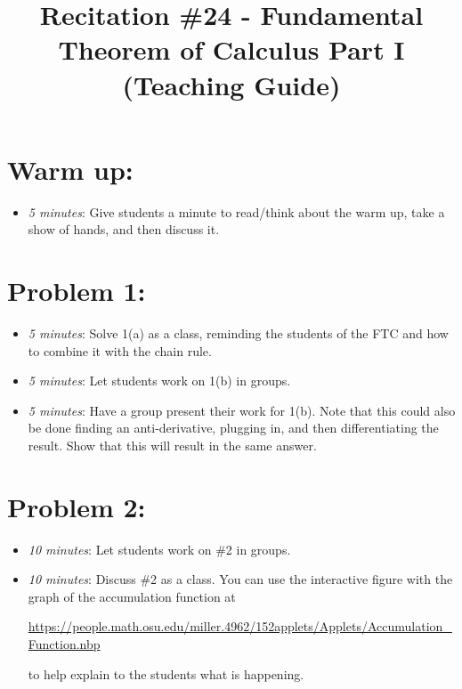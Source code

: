 \documentclass[handout,nooutcomes]{ximera}
\title{Recitation \#24 - Fundamental Theorem of Calculus Part I (Teaching Guide)}
\begin{document}
\begin{abstract}		\end{abstract}
\maketitle


\section*{Warm up:} 
	
	\begin{itemize}
	
	\item  \emph{5 minutes}:  Give students a minute to read/think about the warm up, take a show of hands, and then discuss it.
	
	
	
	\end{itemize}


\section*{Problem 1:}

	\begin{itemize}
	
	\item  \emph{5 minutes}:  Solve 1(a) as a class, reminding the students of the FTC and how to combine it with the chain rule.  
	
	\item  \emph{5 minutes}:  Let students work on 1(b) in groups.  
	
	\item  \emph{5 minutes}:  Have a group present their work for 1(b).  Note that this could also be done finding an anti-derivative, plugging in, and then differentiating the result. Show that this will result in the same answer.
	
	\end{itemize}



\section*{Problem 2:}

	\begin{itemize}
	
	\item  \emph{10 minutes}:  Let students work on \#2 in groups.
		
	\item  \emph{10 minutes}:  Discuss \#2 as a class.  You can use the interactive figure with the graph of the accumulation function at 
	
	\url{https://people.math.osu.edu/miller.4962/152applets/Applets/Accumulation_Function.nbp}
	
	to help explain to the students what is happening.
			
	\end{itemize}
	
\end{document}
